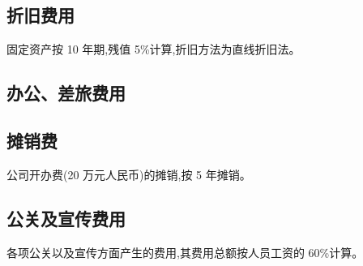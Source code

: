 \subsection{折旧费用}
固定资产按 10 年期,残值 5\%计算,折旧方法为直线折旧法。
\subsection{办公、差旅费用}
\subsection{摊销费}
公司开办费(20 万元人民币)的摊销,按 5 年摊销。
\subsection{公关及宣传费用}
各项公关以及宣传方面产生的费用,其费用总额按人员工资的 60\%计算。
